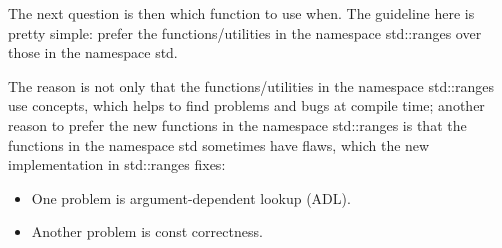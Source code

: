 The next question is then which function to use when. The guideline here is pretty simple: prefer the functions/utilities in the namespace std::ranges over those in the namespace std.

The reason is not only that the functions/utilities in the namespace std::ranges use concepts, which helps to find problems and bugs at compile time; another reason to prefer the new functions in the namespace std::ranges is that the functions in the namespace std sometimes have flaws, which the new implementation in std::ranges fixes:

\begin{itemize}
\item
One problem is argument-dependent lookup (ADL).

\item
Another problem is const correctness.
\end{itemize}

